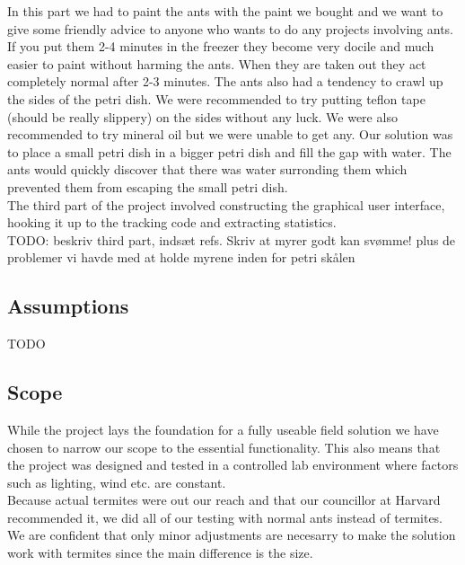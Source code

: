 In this part we had to paint the ants with the paint we bought and we want to give some friendly advice to anyone who wants to do any projects involving ants. If you put them 2-4 minutes in the freezer they become very docile and much easier to paint without harming the ants. When they are taken out they act completely normal after 2-3 minutes. The ants also had a tendency to crawl up the sides of the petri dish. We were recommended to try putting teflon tape (should be really slippery) on the sides without any luck. We were also recommended to try mineral oil but we were unable to get any. Our solution was to place a small petri dish in a bigger petri dish and fill the gap with water. The ants would quickly discover that there was water surronding them which prevented them from escaping the small petri dish. \\

The third part of the project involved constructing the graphical user interface, hooking it up to the tracking code and extracting statistics.  \\

TODO: beskriv third part, indsæt refs. Skriv at myrer godt kan svømme! plus de problemer vi havde med at holde myrene inden for petri skålen

\subsection{Assumptions}

TODO

\subsection{Scope}


While the project lays the foundation for a fully useable field solution we have chosen to narrow our scope to the essential functionality. This also means that the project was designed and tested in a controlled lab environment where factors such as lighting, wind etc. are constant. \\

Because actual termites were out our reach and that our councillor at Harvard recommended it, we did all of our testing with normal ants instead of termites. We are confident that only minor adjustments are necesarry to make the solution work with termites since the main difference is the size. \\

